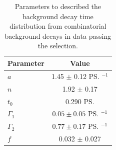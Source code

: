{\begin{table}[ht]
\begin{center}
\begin{tabular}{lc}
\hline
Parameter & Value \\
\hline
$a$ & 1.45 $\pm$ 0.12 \ps$^{-1}$\\
$n$ & 1.92 $\pm$ 0.17 \\
$t_{0}$ & 0.290 \ps \\
$\Gamma_{1}$ & $0.05 \pm 0.05$ \ps$^{-1}$ \\ 
$\Gamma_{2}$ & $0.77 \pm 0.17$ \ps$^{-1}$ \\
$f$ & 0.032 $\pm$ 0.027 \\
\hline
\end{tabular}
\vspace{0.7cm}             
\caption{Parameters to described the background decay time distribution from combinatorial background decays in data passing the \bhh selection.}
\label{tab:bkgparams}
\end{center}
\end{table}

}
